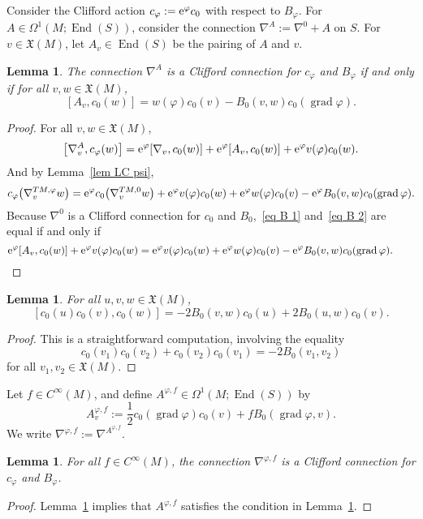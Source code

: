 \documentclass[pdftex]{sigma}%
\numberwithin{equation}{section}
\newtheorem{Lemma}[Theorem]{Lemma}
\DeclareMathOperator{\grad}{grad}
\DeclareMathOperator{\End}{End}
\newcommand{\XX}{\mathfrak{X}}
\begin{document}
Consider the Clifford action $c_{\varphi} := {\rm e}^{\varphi}c_0$ with respect to $B_{\varphi}$.
For $A \in \Omega^1(M; \End(S))$, consider the connection $\nabla^A := \nabla^0 + A$ on $S$. For $v \in \XX(M)$, let $A_v \in \End(S)$ be the pairing of $A$ and $v$.
\begin{Lemma}\label{lem B}
The connection $\nabla^A$ is a Clifford connection for $c_{\varphi}$ and $B_{\varphi}$ if and only if for all $v,w \in \XX(M)$,
\[
[A_v, c_0(w)] = w(\varphi) c_0(v) - B_0(v,w) c_0(\grad \varphi).
\]
\end{Lemma}
\begin{proof}
For all $v,w \in \XX(M)$,
\begin{equation} \label{eq B 1}
\big[\nabla^A_v, c_{\varphi}(w)\big] = {\rm e}^{\varphi}[\nabla_v, c_0(w)] + {\rm e}^{\varphi}[A_v, c_0(w)] + {\rm e}^{\varphi}v(\varphi) c_0(w).
\end{equation}
And by Lemma~\ref{lem LC psi},
\begin{equation} \label{eq B 2}
c_{\varphi}\big(\nabla^{TM, \varphi}_v w\big) = {\rm e}^{\varphi}c_0\big(\nabla^{TM, 0}_v w\big) +
{\rm e}^{\varphi} v(\varphi) c_0(w) + {\rm e}^{\varphi}w(\varphi) c_0(v) - {\rm e}^{\varphi} B_0(v,w) c_0(\grad \varphi).
\end{equation}
Because $\nabla^0$ is a Clifford connection for $c_0$ and $B_0$,~\eqref{eq B 1} and~\eqref{eq B 2} are equal if and only if
\begin{equation*}
{\rm e}^{\varphi}[A_v, c_0(w)] + {\rm e}^{\varphi}v(\varphi) c_0(w) = {\rm e}^{\varphi} v(\varphi) c_0(w) + {\rm e}^{\varphi}w(\varphi) c_0(v) - {\rm e}^{\varphi} B_0(v,w) c_0(\grad \varphi).\tag*{\qed}
\end{equation*}
\renewcommand{\qed}{}
\end{proof}

\begin{Lemma}\label{lem cuvw}
For all $u,v,w \in \XX(M)$,
\[
[c_0(u)c_0(v), c_0(w)] = -2B_0(v,w) c_0(u) + 2 B_0(u,w) c_0(v).
\]
\end{Lemma}
\begin{proof}
This is a straightforward computation, involving the equality
\[
c_0(v_1)c_0(v_2) + c_0(v_2) c_0(v_1) = -2B_0(v_1, v_2)
\]
for all $v_1, v_2 \in \XX(M)$.
\end{proof}

Let $f \in C^{\infty}(M)$, and
define $A^{\varphi, f} \in \Omega^1(M; \End(S))$ by
\[
A^{\varphi, f}_v := \frac{1}{2}c_0(\grad \varphi)c_0(v) + fB_0(\grad \varphi, v).
\]
We write $\nabla^{\varphi,f} := \nabla^{A^{\varphi,f}}$.
\begin{Lemma}\label{lem Clifford psi}
For all $f \in C^{\infty}(M)$,
the connection $\nabla^{\varphi, f}$ is a Clifford connection for $c_{\varphi}$ and $B_{\varphi}$.
\end{Lemma}
\begin{proof}
Lemma~\ref{lem cuvw} implies that $A^{\varphi, f}$ satisfies the condition in Lemma~\ref{lem B}.
\end{proof}
\end{document}
